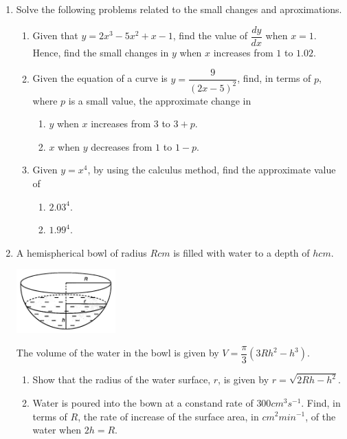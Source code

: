 \documentclass{report}
\begin{document}
\begin{multicols*}{2}
\begin{enumerate}
        \item Solve the following problems related to the small changes and aproximations.
              \begin{enumerate}
                  \item Given that $y = 2x^3 - 5x^2 + x - 1$, find the value of $\dfrac{dy}{dx}$ when
                        $x = 1$. Hence, find the small changes in $y$ when $x$ increases from $1$ to
                        $1.02$.
                  \item Given the equation of a curve is $y = \dfrac{9}{{(2x - 5)}^2}$, find, in terms
                        of $p$, where $p$ is a small value, the approximate change in
                        \begin{enumerate}
                            \item $y$ when $x$ increases from $3$ to $3 + p$.
                            \item $x$ when $y$ decreases from $1$ to $1 - p$.
                        \end{enumerate}
                  \item Given $y = x^4$, by using the calculus method, find the approximate value of
                        \begin{enumerate}
                            \item $2.03^4$.
                            \item $1.99^4$.
                        \end{enumerate}
              \end{enumerate}
        \item A hemispherical bowl of radius $R\textit{cm}$ is filled with water to a depth
              of $h\textit{cm}$.
              \begin{center}
                  \includegraphics[width=0.3\textwidth]{./images/q33.jpeg}
              \end{center}
              The volume of the water in the bowl is given by $V = \dfrac{\pi}{3}(3Rh^2 - h^3)$.
              \begin{enumerate}
                  \item Show that the radius of the water surface, $r$, is given by $r = \sqrt{2Rh -
                                h^2}$.
                  \item Water is poured into the bown at a constand rate of $300cm^3s^{-1}$. Find, in
                        terms of $R$, the rate of increase of the surface area, in $cm^2
                            \textit{min}^{-1}$, of the water when $2h = R$.
              \end{enumerate}
    \end{enumerate}
\end{multicols*}
\end{document}
